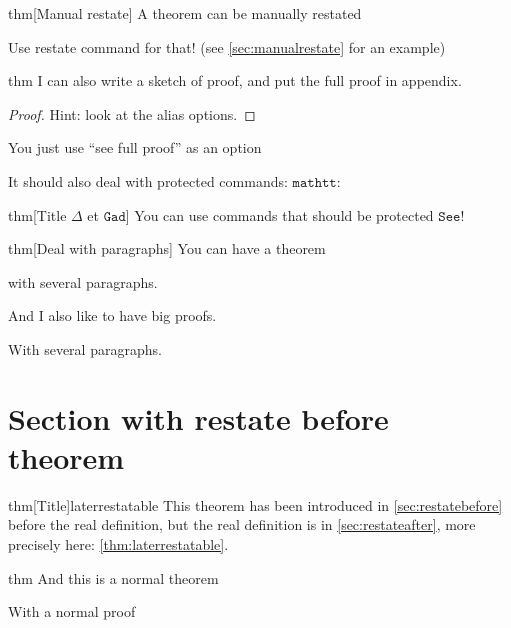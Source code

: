 \documentclass{article}
\begin{document}
\begin{theoremEnd}[restate command=mymanualrestate]{thm}[Manual restate]
  A theorem can be manually restated  
\end{theoremEnd}
\begin{proofEnd}
  Use restate command for that! (see \autoref{sec:manualrestate} for an example)
\end{proofEnd}

\begin{theoremEnd}{thm}
  I can also write a sketch of proof, and put the full proof in appendix.
\end{theoremEnd}
\begin{proof}
  Hint: look at the alias options.
\end{proof}
\begin{proofEnd}
  You just use ``see full proof'' as an option
\end{proofEnd}

It should also deal with protected commands: $\mathtt{mathtt}$:
\begin{theoremEnd}[end]{thm}[Title $\Delta$ et $\mathtt{Gad}$]
  You can use commands that should be protected $\mathtt{See}$!
\end{theoremEnd}

\begin{theoremEnd}[end]{thm}[Deal with paragraphs]
  You can have a theorem

  with several paragraphs.
\end{theoremEnd}
\begin{proofEnd}
  And I also like to have big proofs.
  
  With several paragraphs.
\end{proofEnd}

\section{Section with restate before theorem}\label{sec:restatebefore}

\begin{theoremEndRestateBefore}{thm}[Title]{laterrestatable}
  \label{thm:laterrestatable}
  This theorem has been introduced in \autoref{sec:restatebefore} before the real definition, but the real definition is in \autoref{sec:restateafter}, more precisely here: \autoref{thm:laterrestatable}.
\end{theoremEndRestateBefore}


\begin{theoremEnd}{thm}
  And this is a normal theorem  
\end{theoremEnd}
\begin{proofEnd}
  With a normal proof  
\end{proofEnd}
\end{document}
